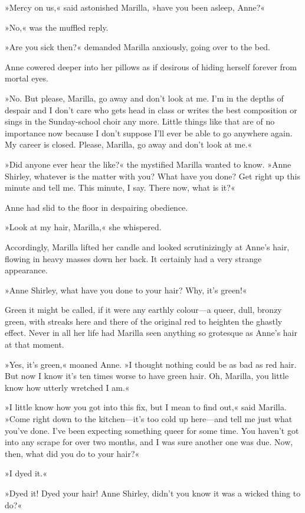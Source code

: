 »Mercy on us,« said astonished Marilla, »have you been asleep, Anne?«

»No,« was the muffled reply.

»Are you sick then?« demanded Marilla anxiously, going over to the bed.

Anne cowered deeper into her pillows as if desirous of hiding herself forever from mortal eyes.

»No. But please, Marilla, go away and don't look at me. I'm in the depths of despair and I don't care who gets head in class or writes the best composition or sings in the Sunday-school choir any more. Little things like that are of no importance now because I don't suppose I'll ever be able to go anywhere again. My career is closed. Please, Marilla, go away and don't look at me.«

»Did anyone ever hear the like?« the mystified Marilla wanted to know. »Anne Shirley, whatever is the matter with you? What have you done? Get right up this minute and tell me. This minute, I say. There now, what is it?«

Anne had slid to the floor in despairing obedience.

»Look at my hair, Marilla,« she whispered.

Accordingly, Marilla lifted her candle and looked scrutinizingly at Anne's hair, flowing in heavy masses down her back. It certainly had a very strange appearance.

»Anne Shirley, what have you done to your hair? Why, it's green!«

Green it might be called, if it were any earthly colour—a queer, dull, bronzy green, with streaks here and there of the original red to heighten the ghastly effect. Never in all her life had Marilla seen anything so grotesque as Anne's hair at that moment.

»Yes, it's green,« moaned Anne. »I thought nothing could be as bad as red hair. But now I know it's ten times worse to have green hair. Oh, Marilla, you little know how utterly wretched I am.«

»I little know how you got into this fix, but I mean to find out,« said Marilla. »Come right down to the kitchen—it's too cold up here—and tell me just what you've done. I've been expecting something queer for some time. You haven't got into any scrape for over two months, and I was sure another one was due. Now, then, what did you do to your hair?«

»I dyed it.«

»Dyed it! Dyed your hair! Anne Shirley, didn't you know it was a wicked thing to do?«

